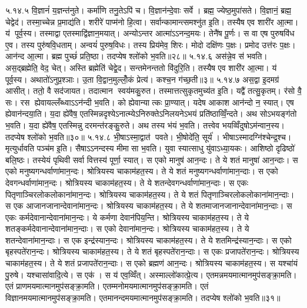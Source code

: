 ५.१४.५
वि॒ज्ञानं॑ य॒ज्ञन्त॑नुते। कर्मा॑णि तनु॒तेऽपि॑ च। वि॒ज्ञान॑न्दे॒वाः सर्वे। ब्रह्म॒ ज्येष्ठ॒मुपा॑सते। वि॒ज्ञानं॒ ब्रह्म॒ चेद्वेद॑। तस्मा॒च्चेन्न प्र॒माद्य॑ति। शरीरे॑ पाप्म॑नो हि॒त्वा। सर्वान्कामान्त्समश्नु॑त इ॒ति। तस्यैष एव शारी॑र आ॒त्मा। य॑ पूर्व॒स्य। तस्माद्वा एतस्माद्वि॑ज्ञान॒मयात्। अन्योऽन्तर आत्मा॑ऽऽनन्द॒मयः। तेनै॑ष पू॒र्णः। स वा एष पुरुषवि॑ध ए॒व। तस्य पुरु॑षवि॒धताम्। अन्वयं॑ पुरुष॒विधः। तस्य प्रिय॑मेव॒ शिरः। मोदो दक्षि॑णः प॒क्षः। प्रमोद उत्त॑रः प॒क्षः। आन॑न्द आ॒त्मा। ब्रह्म पुच्छं॑ प्रति॒ष्ठा। तदप्येष श्लो॑को भ॒वति॥२८॥
५.१४.६
अस॑न्ने॒व स॑ भवति। अस॒द्ब्रह्मेति॒ वेद॒ चेत्। अस्ति ब्रह्मेति॑ चेद्वे॒द। सन्तमेनन्ततो वि॑दुरि॒ति। तस्यैष एव शारी॑र आ॒त्मा। य॑ पूर्व॒स्य। अथातो॑ऽनुप्र॒श्ञाः। उ॒ता वि॒द्वान॒मुल्लोँ॒कं प्रेत्य॑। कश्च॒न ग॑च्छ॒ती॥३॥%
५.१४.७
अस॒द्वा इ॒दमग्र॑ आसीत्। ततो॒ वै सद॑जायत। तदात्मान स्वय॑मकु॒रुत। तस्मात्तत्सुकृतमुच्य॑त इ॒ति। यद्वै॑ तत्सु॒कृतम्। र॑सो वै॒ सः। रस ह्येवायल्लँब्ध्वाऽऽन॑न्दी भ॒वति। को ह्येवान्यात्कः प्रा॒ण्यात्। यदेष आकाश आन॑न्दो न॒ स्यात्। एष ह्येवान॑न्दया॒ति। य॒दा ह्ये॑वैष॒ एतस्मिन्नदृश्येऽनात्म्येऽनिरुक्तेऽनिलयनेऽभयं प्रति॑ष्ठाव्विँ॒न्दते। अथ सोऽभयङ्ग॑तो भ॒वति। य॒दा ह्ये॑वैष॒ एतस्मिन्नु दरमन्त॑रङ्कु॒रुते। अथ तस्य भ॑यं भ॒वति। तत्त्वेव भयव्विँदुषोऽम॑न्वान॒स्य। तदप्येष श्लो॑को भ॒वति॥३०॥
५.१४.८
भी॒षाऽस्मा॒द्वात॑ पवते। भी॒षोदे॑ति॒ सूर्य॑। भीषाऽस्मादग्नि॑श्चेन्द्र॒श्च। मृत्युर्धावति पञ्च॑म इ॒ति। सैषाऽऽनन्दस्य मीमासा भ॒वति। युवा स्यात्साधु यु॑वाऽध्या॒यकः। आशिष्ठो दृढिष्ठो॑ बलि॒ष्ठः। तस्येयं पृथिवी सर्वा वित्तस्य॑ पूर्णा॒ स्यात्। स एको मानुष॑ आन॒न्दः। ते ये शतं मानुषा॑ आन॒न्दाः। स एको मनुष्यगन्धर्वाणा॑मान॒न्दः। श्रोत्रियस्य चाकाम॑हत॒स्य। ते ये शतं मनुष्यगन्धर्वाणा॑मान॒न्दाः। स एको देवगन्धर्वाणा॑मान॒न्दः। श्रोत्रियस्य चाकाम॑हत॒स्य। ते ये शतन्देवगन्धर्वाणा॑मान॒न्दाः। स एकः पितृणाञ्चिरलोकलोकाना॑मान॒न्दः। श्रोत्रियस्य चाकाम॑हत॒स्य। ते ये शतं पितृणाञ्चिरलोकलोकाना॑मान॒न्दाः। स एक आजानजानान्देवाना॑मान॒न्दः। श्रोत्रियस्य चाकाम॑हत॒स्य। ते ये शतमाजानजानान्देवाना॑मान॒न्दाः। स एकः कर्मदेवानान्देवाना॑मान॒न्दः। ये कर्मणा देवान॑पिय॒न्ति। श्रोत्रियस्य चाकाम॑हत॒स्य। ते ये शतङ्कर्मदेवानान्देवाना॑मान॒न्दाः। स एको देवाना॑मान॒न्दः। श्रोत्रियस्य चाकाम॑हत॒स्य। ते ये शतन्देवाना॑मान॒न्दाः। स एक इन्द्र॑स्यान॒न्दः। श्रोत्रियस्य चाकाम॑हत॒स्य। ते ये शतमिन्द्र॑स्यान॒न्दाः। स एको बृहस्पते॑रान॒न्दः। श्रोत्रियस्य चाकाम॑हत॒स्य। ते ये शतं बृहस्पते॑रान॒न्दाः। स एकः प्रजापते॑रान॒न्दः। श्रोत्रियस्य चाकाम॑हत॒स्य। ते ये शतं प्रजापते॑रान॒न्दाः। स एको ब्रह्मण॑ आन॒न्दः। श्रोत्रियस्य चाकाम॑हत॒स्य। स यश्चा॑यं पु॒रुषे। यश्चासा॑वादि॒त्ये। स एक॑। स य॑ एव॒व्विँत्। अस्माल्लो॑कात्प्रे॒त्य। एतमन्नमयमात्मानमुप॑सङ्क्रा॒मति। एतं प्राणमयमात्मानमुप॑सङ्क्रा॒मति। एतम्मनोमयमात्मानमुप॑सङ्क्रा॒मति। एतं विज्ञानमयमात्मानमुप॑सङ्क्रा॒मति। एतमानन्दमयमात्मानमुप॑सङ्क्रा॒मति। तदप्येष श्लो॑को भ॒वति॥३१॥
